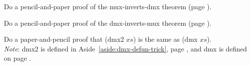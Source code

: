 \begin{ExerciseList}
\Exercise {}
Do a pencil-and-paper proof of the mux-inverts-dmx theorem
(page \pageref{thm:mux-inverts-dmx}).

\Exercise
Do a pencil-and-paper proof of the dmx-inverts-mux theorem
(page \pageref{thm:dmx-inverts-mux}).

\Exercise
\label{dmx2-eq-dmx}
Do a paper-and-pencil proof that
(dmx2 $xs$) is the same as (dmx $xs$).\\
\emph{Note}: dmx2 is defined in Aside~\ref{aside:dmx-defun-trick}, page \pageref{aside:dmx-defun-trick},
and dmx is defined on page \pageref{dmx-defun}.

\end{ExerciseList}
